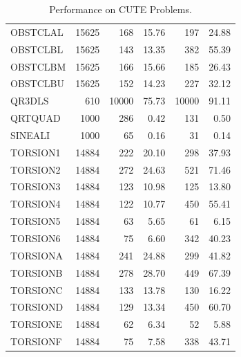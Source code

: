 \begin{table}[bhpt]
\begin{center}
\begin{tabular}{|lr|rr|rr|}
OBSTCLAL &  15625 &  168 & 15.76 &        197 &  24.88  \\ 
OBSTCLBL &  15625 &  143 & 13.35 &        382 &  55.39  \\ 
OBSTCLBM &  15625 &  166 & 15.66 &        185 &  26.43  \\ 
OBSTCLBU &  15625 &  152 & 14.23 &        227 &  32.12  \\ 
QR3DLS &  610 &  10000 & 75.73 &        10000 &  91.11  \\ 
QRTQUAD &  1000 &  286 & 0.42 &        131 &  0.50  \\ 
SINEALI &  1000 &  65 & 0.16 &        31 &  0.14  \\ 
TORSION1 &  14884 &  222 & 20.10 &        298 &  37.93  \\ 
TORSION2 &  14884 &  272 & 24.63 &        521 &  71.46  \\ 
TORSION3 &  14884 &  123 & 10.98 &        125 &  13.80  \\ 
TORSION4 &  14884 &  122 & 10.77 &        450 &  55.41  \\ 
TORSION5 &  14884 &  63 & 5.65 &        61 &  6.15  \\ 
TORSION6 &  14884 &  75 & 6.60 &        342 &  40.23  \\ 
TORSIONA &  14884 &  241 & 24.88 &        299 &  41.82  \\ 
TORSIONB &  14884 &  278 & 28.70 &        449 &  67.39  \\ 
TORSIONC &  14884 &  133 & 13.78 &        130 &  16.22  \\ 
TORSIOND &  14884 &  129 & 13.34 &        450 &  60.70  \\ 
TORSIONE &  14884 &  62 & 6.34 &        52 &  5.88  \\ 
TORSIONF &  14884 &  75 & 7.58 &        338 &  43.71  \\ 

\hline
\end{tabular}
\caption{Performance on CUTE Problems.}
\label{cute}
\end{center}
\end{table}


